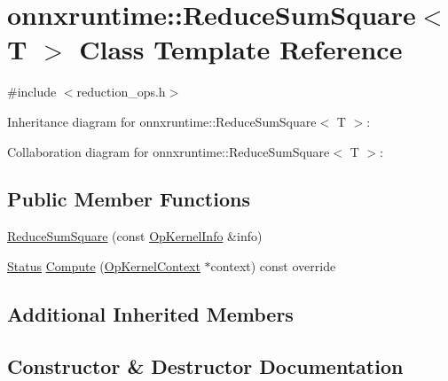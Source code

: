 \hypertarget{classonnxruntime_1_1ReduceSumSquare}{}\section{onnxruntime\+:\+:Reduce\+Sum\+Square$<$ T $>$ Class Template Reference}
\label{classonnxruntime_1_1ReduceSumSquare}


{\ttfamily \#include $<$reduction\+\_\+ops.\+h$>$}



Inheritance diagram for onnxruntime\+:\+:Reduce\+Sum\+Square$<$ T $>$\+:


Collaboration diagram for onnxruntime\+:\+:Reduce\+Sum\+Square$<$ T $>$\+:
\subsection*{Public Member Functions}
\begin{DoxyCompactItemize}
\item 
\mbox{\hyperlink{classonnxruntime_1_1ReduceSumSquare_ad91f9cc16f05b43af1800eeebe87cb1d}{Reduce\+Sum\+Square}} (const \mbox{\hyperlink{classonnxruntime_1_1OpKernelInfo}{Op\+Kernel\+Info}} \&info)
\item 
\mbox{\hyperlink{classonnxruntime_1_1common_1_1Status}{Status}} \mbox{\hyperlink{classonnxruntime_1_1ReduceSumSquare_aeb7e5a975972928096669113a7ef7f38}{Compute}} (\mbox{\hyperlink{classonnxruntime_1_1OpKernelContext}{Op\+Kernel\+Context}} $\ast$context) const override
\end{DoxyCompactItemize}
\subsection*{Additional Inherited Members}


\subsection{Constructor \& Destructor Documentation}
\mbox{\label{classonnxruntime_1_1ReduceSumSquare_ad91f9cc16f05b43af1800eeebe87cb1d}} 
